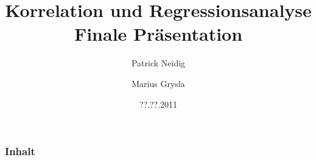 \documentclass{beamer}
\begin{document}
\title{Korrelation und Regressionsanalyse\\
Finale Präsentation}
\author{Patrick Neidig \and Marius Grysla}
\date{??.??.2011}
\frame{\titlepage}

\begin{frame}
 \frametitle{Inhalt}
 \tableofcontents
\end{frame}
\end{document}
